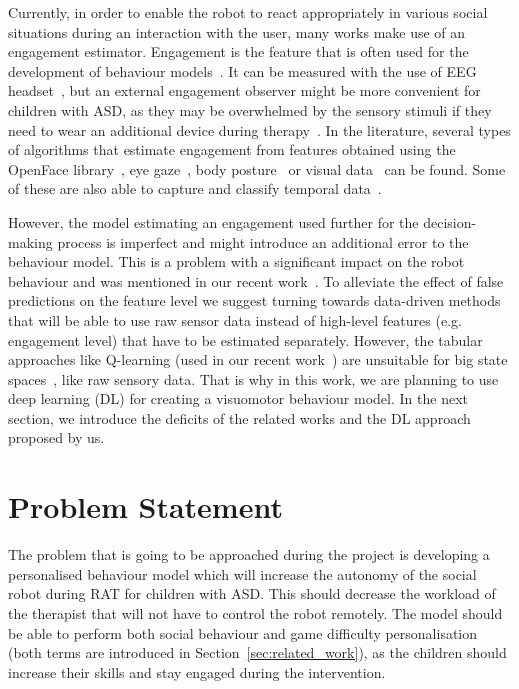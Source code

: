 \documentclass[thesis]{mas_proposal}
\begin{document}
Currently, in order to enable the robot to react appropriately in various social situations during an interaction with the user, many works make use of an engagement estimator. Engagement is the feature that is often used for the development of behaviour models~\cite{senft2015sparc,senft2015human,tsiakas2018task,del2022learning}. It can be measured with the use of EEG headset~\cite{tsiakas2018task}, but an external engagement observer might be more convenient for children with ASD, as they may be overwhelmed by the sensory stimuli if they need to wear an additional device during therapy~\cite{javed2019robotic}. In the literature, several types of algorithms that estimate engagement from features obtained using the OpenFace library~\cite{baltrusaitis2018openface, jain2020modeling, kaur2019domain, karimah2021implementation}, eye gaze~\cite{khorrami2014system},  body posture~\cite{ritschel2017adapting} or visual data~\cite{mane2018engagement, del2020you} can be found. Some of these are also able to capture and classify temporal data~\cite{del2020you, karimah2021implementation}.

However, the model estimating an engagement used further for the decision-making process is imperfect and might introduce an additional error to the behaviour model. This is a problem with a significant impact on the robot behaviour and was mentioned in our recent work~\cite{stolarz2022learningbased}. To alleviate the effect of false predictions on the feature level we suggest turning towards data-driven methods that will be able to use raw sensor data instead of high-level features (e.g. engagement level) that have to be estimated separately. However, the tabular approaches like Q-learning (used in our recent work~\cite{stolarz2022learningbased}) are unsuitable for big state spaces~\cite{akalin2021reinforcement}, like raw sensory data. That is why in this work, we are planning to use deep learning (DL) for creating a visuomotor behaviour model. In the next section, we introduce the deficits of the related works and the DL approach proposed by us.

\section{Problem Statement}
\label{sec:problem_statement}

The problem that is going to be approached during the project is developing a personalised behaviour model which will increase the autonomy of the social robot during RAT for children with ASD. This should decrease the workload of the therapist that will not have to control the robot remotely. The model should be able to perform both social behaviour and game difficulty personalisation (both terms are introduced in Section~\ref{sec:related_work}), as the children should increase their skills and stay engaged during the intervention.
\end{document}

